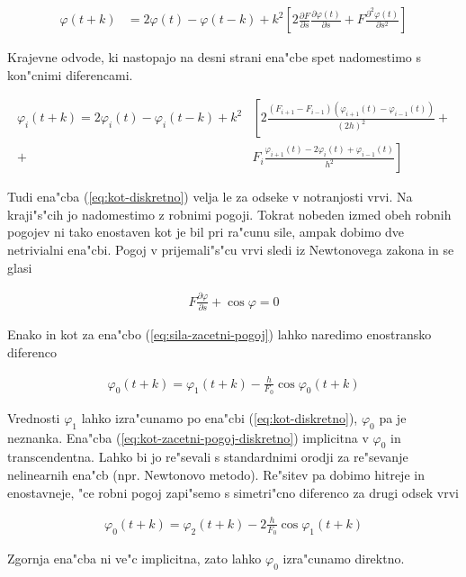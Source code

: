 \documentclass[a4paper,10pt]{article}
\renewcommand{\phi}{\varphi}
\newcommand{\parcialno}[2]{
  \frac{\partial #1}{\partial #2}
}
\newcommand{\parcdva}[2]{
  \frac{\partial^2 #1}{\partial #2 ^2}
}
\begin{document}
\begin{align}
 \label{eq:kot-razvoj}
 \phi(t+k) &= 2\phi(t) - \phi(t-k) + k^2 \left[ 2\parcialno{F}{s}\parcialno{\phi(t)}{s} + F\parcdva{\phi(t)}{s} \right]
\end{align}

Krajevne odvode, ki nastopajo na desni strani ena"cbe spet nadomestimo s kon"cnimi diferencami. 

\begin{align}
 \phi_i(t+k) = 2\phi_i(t) - \phi_i(t-k) + k^2 &\left[2\frac{(F_{i+1}-F_{i-1})(\phi_{i+1}(t)-\phi_{i-1}(t))}{(2h)^2}\right. + \nonumber \\
+ & \left. F_i\frac{\phi_{i+1}(t) - 2\phi_i(t) + \phi_{i-1}(t)}{h^2}\right] \label{eq:kot-diskretno}
\end{align}

Tudi ena"cba (\ref{eq:kot-diskretno}) velja le za odseke v notranjosti vrvi. Na kraji"s"cih jo nadomestimo z robnimi pogoji. Tokrat nobeden izmed obeh robnih pogojev ni tako enostaven kot je bil pri ra"cunu sile, ampak dobimo dve netrivialni ena"cbi. Pogoj v prijemali"s"cu vrvi sledi iz Newtonovega zakona in se glasi

\begin{align}
 \label{eq:kot-zacetni-pogoj}
 F \parcialno{\phi}{s} + \cos \phi = 0
\end{align}

Enako in kot za ena"cbo (\ref{eq:sila-zacetni-pogoj}) lahko naredimo enostransko diferenco

\begin{align}
 \label{eq:kot-zacetni-pogoj-diskretno}
 \phi_0(t+k) = \phi_1(t+k) - \frac{h}{F_0} \cos \phi_0(t+k)
\end{align}

Vrednosti $\phi_1$ lahko izra"cunamo po ena"cbi (\ref{eq:kot-diskretno}), $\phi_0$ pa je neznanka. Ena"cba (\ref{eq:kot-zacetni-pogoj-diskretno}) implicitna v $\phi_0$ in transcendentna. Lahko bi jo re"sevali s standardnimi orodji za re"sevanje nelinearnih ena"cb (npr. Newtonovo metodo). Re"sitev pa dobimo hitreje in enostavneje, "ce robni pogoj zapi"semo s simetri"cno diferenco za drugi odsek vrvi 

\begin{align}
 \label{eq:kot-zacetni-pogoj-diskretno-enostavno}
 \phi_0(t+k) = \phi_2(t+k) - 2\frac{h}{F_0} \cos \phi_1(t+k)
\end{align}

Zgornja ena"cba ni ve"c implicitna, zato lahko $\phi_0$ izra"cunamo direktno. 
\end{document}
